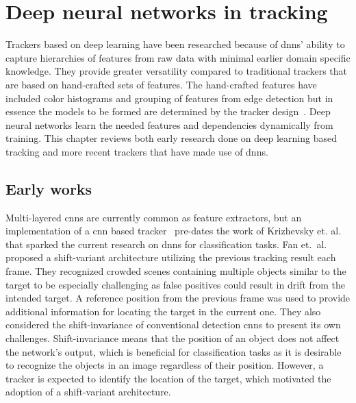 \section{Deep neural networks in tracking}
Trackers based on deep learning have been researched because of \ac{dnn}s' ability to capture hierarchies of features from raw data with minimal earlier domain specific knowledge. They provide greater versatility compared to traditional trackers that are based on hand-crafted sets of features. The hand-crafted features have included color histograms and grouping of features from edge detection but in essence the models to be formed are determined by the tracker design~\cite{MEAN_SHIFT}. Deep neural networks learn the needed features and dependencies dynamically from training. This chapter reviews both early research done on deep learning based tracking and more recent trackers that have made use of \ac{dnn}s.

\subsection{Early works}\label{ssec:early}
Multi-layered \ac{cnn}s are currently common as feature extractors, but an implementation of a \ac{cnn} based tracker~\cite{HUMAN_CNN} pre-dates the work of Krizhevsky et. al.~\cite{NIPS_IMAGENET} that sparked the current research on \ac{dnn}s for classification tasks. Fan et.~al.~\cite{HUMAN_CNN} proposed a shift-variant architecture utilizing the previous tracking result each frame. They recognized crowded scenes containing multiple objects similar to the target to be especially challenging as false positives could result in drift from the intended target. A reference position from the previous frame was used to provide additional information for locating the target in the current one. They also considered the shift-invariance of conventional detection \ac{cnn}s to present its own challenges. Shift-invariance means that the position of an object does not affect the network's output, which is beneficial for classification tasks as it is desirable to recognize the objects in an image regardless of their position. However, a tracker is expected to identify the location of the target, which motivated the adoption of a shift-variant architecture.~\cite{HUMAN_CNN}

